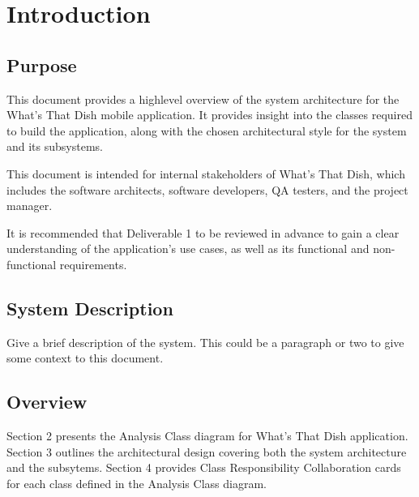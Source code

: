 \documentclass[]{article}
\begin{document}
\newpage
\section{Introduction}
\label{sec:introduction}

\subsection{Purpose}
\label{sub:purpose}
This document provides a highlevel overview of the system architecture for the What’s That Dish mobile application.
It provides insight into the classes required to build the application, along with the chosen architectural style for the system and its subsystems.

This document is intended for internal stakeholders of What’s That Dish, which includes the software architects, software developers, QA testers, and the project manager.

It is recommended that Deliverable 1 to be reviewed in advance to gain a clear understanding of the application’s use cases, as well as its functional and non-functional requirements.

\subsection{System Description}
\label{sub:system_description}
Give a brief description of the system. This could be a paragraph or two to give some context to this document.


\subsection{Overview}
\label{sub:overview}
Section 2 presents the Analysis Class diagram for What's That Dish application.
Section 3 outlines the architectural design covering both the system architecture and the subsytems.
Section 4 provides Class Responsibility Collaboration cards for each class defined in the Analysis Class diagram.

\end{document}
